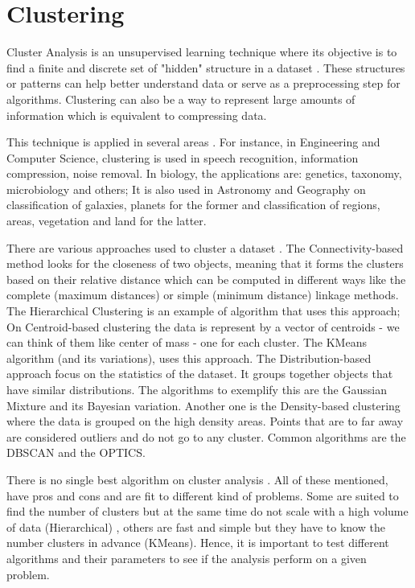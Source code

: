 \section{Clustering}

Cluster Analysis is an unsupervised learning technique where its objective is to find a finite and discrete set of "hidden" structure in a dataset \cite{xu2008clustering}. These structures or patterns can help better understand data or serve as a preprocessing step for algorithms. Clustering can also be a way to represent large amounts of information which is equivalent to compressing data. 

This technique is applied in several areas \cite{sabine2001cluster}. For instance, in Engineering and Computer Science, clustering is used in speech recognition, information compression, noise removal. In biology, the applications are: genetics, taxonomy, microbiology and others; It is also used in Astronomy and Geography on classification of galaxies, planets for the former and classification of regions, areas, vegetation and land for the latter.

There are various approaches used to cluster a dataset \cite{wikipedia_cluster_analysis}. The Connectivity-based method looks for the closeness of two objects, meaning that it forms the clusters based on their relative distance which can be computed in different ways like the complete (maximum distances) or simple (minimum distance) linkage methods. The Hierarchical Clustering is an example of algorithm that uses this approach; On Centroid-based clustering the data is represent by a vector of centroids - we can think of them like center of mass - one for each cluster. The KMeans algorithm (and its variations), uses this approach. The Distribution-based approach focus on the statistics of the dataset. It groups together objects that have similar distributions. The algorithms to exemplify this are the Gaussian Mixture and its Bayesian variation. Another one is the Density-based clustering where the data is grouped on the high density areas. Points that are to far away are considered outliers and do not go to any cluster. Common algorithms are the DBSCAN and the OPTICS.


There is no single best algorithm on cluster analysis \cite{james2013introduction}. All of these mentioned, have pros and cons and are fit to different kind of problems. Some are suited to find the number of clusters but at the same time do not scale with a high volume of data (Hierarchical) \cite{franti2006fast}, others are fast and simple but they have to know the number clusters in advance (KMeans). Hence, it is important to test different algorithms and their parameters to see if the analysis perform on a given problem.


